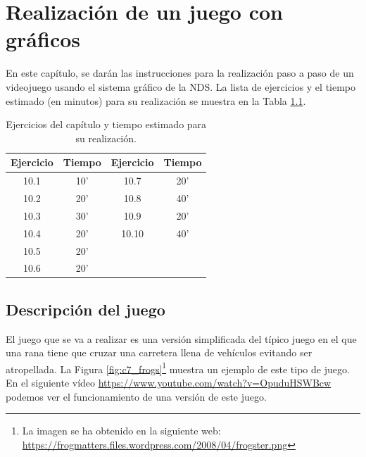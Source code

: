 \chapter{Realización de un juego con gráficos}

En este capítulo, se darán las instrucciones para la realización paso a paso de un videojuego usando el sistema gráfico de la NDS. La lista de ejercicios y el tiempo estimado (en minutos) para su realización se muestra en la Tabla \ref{c10_tab:ejercicios}.

\begin{table}[t]
	\centering
	\caption{Ejercicios del capítulo y tiempo estimado para su realización.}
	\begin{tabular}{|c|c||c|c|}
		\hline 
		Ejercicio & Tiempo & Ejercicio & Tiempo\\ 
		\hline 
		10.1 & 10' & 10.7  & 20'  \\ 
		10.2 & 20' & 10.8  & 40' \\ 
		10.3 & 30' & 10.9  & 20' \\ 
		10.4 & 20' & 10.10 & 40' \\ 
		10.5 & 20' & & \\
		10.6 & 20' & & \\ 
		\hline 
	\end{tabular} 
	\label{c10_tab:ejercicios}
\end{table}

\section{Descripción del juego}
El juego que se va a realizar es una versión simplificada del típico juego en el que una rana tiene que cruzar una carretera llena de vehículos evitando ser atropellada. La Figura \ref{fig:c7_frogs}\footnote{La imagen se ha obtenido en la siguiente web: \url{https://frogmatters.files.wordpress.com/2008/04/frogster.png}} muestra un ejemplo de este tipo de juego. En el siguiente vídeo \url{https://www.youtube.com/watch?v=OpuduHSWBcw} podemos ver el funcionamiento de una versión de este juego.

